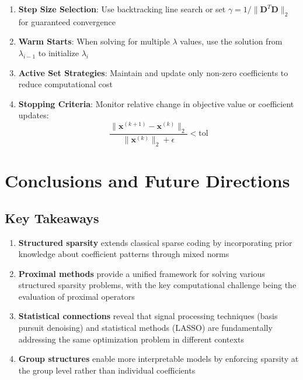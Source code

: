 \documentclass[12pt]{article}
\renewcommand{\vec}[1]{\mathbf{#1}}
\theoremstyle{definition}
\begin{document}
\begin{enumerate}
    \item \textbf{Step Size Selection}: Use backtracking line search or set $\gamma = 1/\|\vec{D}^T\vec{D}\|_2$ for guaranteed convergence

    \item \textbf{Warm Starts}: When solving for multiple $\lambda$ values, use the solution from $\lambda_{i-1}$ to initialize $\lambda_i$

    \item \textbf{Active Set Strategies}: Maintain and update only non-zero coefficients to reduce computational cost

    \item \textbf{Stopping Criteria}: Monitor relative change in objective value or coefficient updates:
          \begin{equation}
              \frac{\|\vec{x}^{(k+1)} - \vec{x}^{(k)}\|_2}{\|\vec{x}^{(k)}\|_2 + \epsilon} < \text{tol}
          \end{equation}
\end{enumerate}

\newpage

\section{Conclusions and Future Directions}

\subsection{Key Takeaways}

\begin{enumerate}
    \item \textbf{Structured sparsity} extends classical sparse coding by incorporating prior knowledge about coefficient patterns through mixed norms

    \item \textbf{Proximal methods} provide a unified framework for solving various structured sparsity problems, with the key computational challenge being the evaluation of proximal operators

    \item \textbf{Statistical connections} reveal that signal processing techniques (basis pursuit denoising) and statistical methods (LASSO) are fundamentally addressing the same optimization problem in different contexts

    \item \textbf{Group structures} enable more interpretable models by enforcing sparsity at the group level rather than individual coefficients
\end{enumerate}
\end{document}
